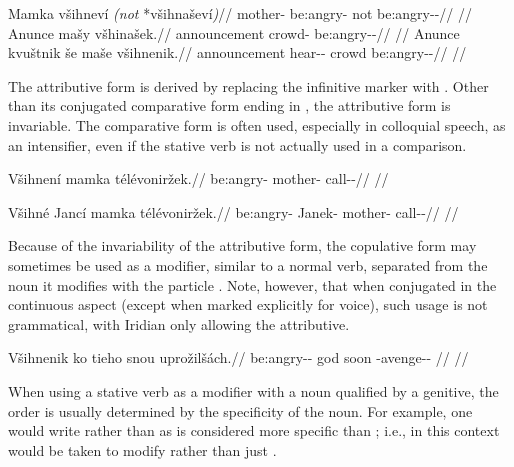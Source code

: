 \pex
\a\begingl
\gla Mamka všihneví \emph{(not} *všihnaševí\emph{)}//
\glb mother-\Dim{} be:angry-\Cont{} not be:angry-\Av{}-\Cont{}//
\glft {}//
\endgl
\a \begingl
\gla Anunce mašy všhinašek.//
\glb announcement crowd-\Acc{} be:angry-\Av{}-\Pf{}//
\glft {}//
\endgl
\a \begingl
\gla Anunce kvuštnik še maše všihnenik.//
\glb announcement hear-\Pv{}-\Pf{} \Com{} crowd be:angry-\Pv{}-\Pf{}//
\glft {}//
\endgl
\xe

The attributive form is derived by replacing the infinitive marker  with
. Other than its conjugated comparative form ending in , the
attributive form is invariable. The comparative form is often used, especially in colloquial speech,
as an intensifier, even if the stative verb is not actually used in a
comparison.

\ex
\begingl
\gla Všihnení mamka télévoniržek.//
\glb be:angry- mother-\Dim{} call-\Av{}-\Pf{}//
\glft {}//
\endgl
\xe

\ex
\begingl
\gla Všihné Jancí mamka télévoniržek.//
\glb be:angry-\Att{} Janek-\Gen{} mother-\Dim{} call-\Av{}-\Pf{}//
\glft {}//
\endgl
\xe

Because of the invariability of the attributive form, the copulative form may
sometimes be used as a modifier, similar to a normal verb, separated from the
noun it modifies with the particle . Note, however, that when conjugated
in the continuous aspect (except when marked explicitly for voice), such usage
is not grammatical, with Iridian only allowing the attributive.

\ex
\begingl
\gla Všihnenik ko tieho snou uprožilšách.//
\glb be:angry-\Pv{}-\Pf{} \Att{} god soon \Refl{}-avenge-\Av{}-\Ctp{} //
\glft {}//
\endgl
\xe

When using a stative verb as a modifier with a noun qualified by a genitive, the
order is usually determined by the specificity of the noun. For example, one
would write  rather than
 as  is considered more specific than
; i.e., in this context  would be taken to modify
 rather than just .

